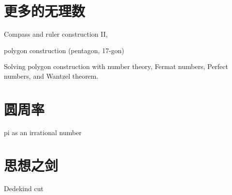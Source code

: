 \documentclass[b5paper]{ctexart}
\begin{document}
\section{更多的无理数}
Compass and ruler construction II,

polygon construction (pentagon, 17-gon)

Solving polygon construction with number theory, Fermat numbers, Perfect numbers, and Wantzel theorem.

\section{圆周率}
pi as an irrational number

\section{思想之剑}
Dedekind cut
\end{document}
